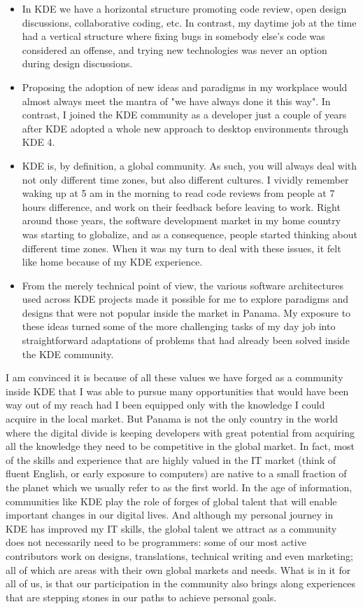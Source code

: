 \begin{itemize}
\item In KDE we have a horizontal structure promoting code review,
  open design discussions, collaborative coding, etc. In contrast, my
  daytime job at the time had a vertical structure where fixing bugs
  in somebody else's code was considered an offense, and trying new
  technologies was never an option during design discussions.
\item Proposing the adoption of new ideas and paradigms in my
  workplace would almost always meet the mantra of "we have always
  done it this way". In contrast, I joined the KDE community as a
  developer just a couple of years after KDE adopted a whole new
  approach to desktop environments through KDE 4.
\item KDE is, by definition, a global community. As such, you will
  always deal with not only different time zones, but also different
  cultures. I vividly remember waking up at 5 am in the morning to
  read code reviews from people at 7 hours difference, and work on
  their feedback before leaving to work. Right around those years, the
  software development market in my home country was starting to
  globalize, and as a consequence, people started thinking about
  different time zones. When it was my turn to deal with these issues,
  it felt like home because of my KDE experience.
\item From the merely technical point of view, the various software
  architectures used across KDE projects made it possible for me to
  explore paradigms and designs that were not popular inside the
  market in Panama. My exposure to these ideas turned some of the more
  challenging tasks of my day job into straightforward adaptations of
  problems that had already been solved inside the KDE community.
\end{itemize}

I am convinced it is because of all these values we have forged
as a community inside KDE that I was able to pursue many opportunities
that would have been way out of my reach had I been equipped only with the
knowledge I could acquire in the local market. But Panama is not the
only country in the world where the digital divide is keeping
developers with great potential from acquiring all the knowledge they
need to be competitive in the global market. In fact, most of the
skills and experience that are highly valued in the IT market (think
of fluent English, or early exposure to computers) are native to a
small fraction of the planet which we usually refer to as the first
world. In the age of information, communities like KDE play the role
of forges of global talent that will enable important changes in our
digital lives. And although my personal journey in KDE has improved my
IT skills, the global talent we attract as a community does not
necessarily need to be programmers: some of our most active
contributors work on designs, translations, technical writing and even
marketing; all of which are areas with their own global markets and
needs. What is in it for all of us, is that our participation in the
community also brings along experiences that are stepping stones in
our paths to achieve personal goals.

